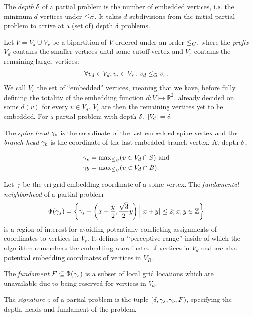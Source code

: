 The \emph{depth} $\delta$ of a partial problem is the number of embedded vertices, i.e. the minimum $d$ vertices under $\leq_G$. It takes $d$ subdivisions from the initial partial problem to arrive at a (set of) depth $\delta$ problems.

Let $V = V_d \cup V_r$ be a bipartition of $V$ ordered under an order $\leq_G$, where the \emph{prefix} $V_d$ contains the smaller vertices until some cutoff vertex and $V_r$ contains the remaining larger vertices: $$\forall v_d \in V_d, v_r \in V_r: v_d \leq_G v_r.$$ We call $V_d$ the set of ``embedded'' vertices, meaning that we have, before fully defining the totality of the embedding function $d: V \mapsto \mathbb R^2$, already decided on some $d(v)$ for every $v \in V_d$. $V_r$ are then the remaining vertices yet to be embedded. For a partial problem with depth $\delta$, $|V_d| = \delta.$

The \emph{spine head} $\gamma_s$ is the coordinate of the last embedded spine vertex and the \emph{branch head} $\gamma_b$ is the coordinate of the last embedded branch vertex. At depth $\delta$, 

\begin{equation*}
\begin{aligned}
\gamma_s &= \mathrm{max}_{\leq_G}(v \in V_d \cap S) \text{ and} \\
\gamma_b &= \mathrm{max}_{\leq_G}(v \in V_d \cap B).
\end{aligned}
\end{equation*}

Let $\gamma$ be the tri-grid embedding coordinate of a spine vertex. The \emph{fundamental neighborhood} of a partial problem $$\Phi(\gamma_s) = \left\{ \gamma_s + \left(x + \frac y2, \frac{\sqrt3}2 y\right) \Big\vert |x + y| \leq 2; x, y \in \mathbb Z \right\}$$ is a region of interest for avoiding potentially conflicting assignments of coordinates to vertices in $V_r$. It defines a ``perceptive range'' inside of which the algorithm remembers the embedding coordinates of vertices in $V_d$ and are also potential embedding coordinates of vertices in $V_R$.

The \emph{fundament} $F \subseteq \Phi(\gamma_s)$ is a subset of local grid locations which are unavailable due to being reserved for vertices in $V_d$.

The \emph{signature} $\varsigma$ of a partial problem is the tuple $(\delta, \gamma_s, \gamma_b, F)$, specifying the depth, heads and fundament of the problem.

